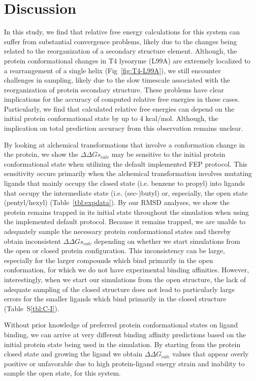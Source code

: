 \documentclass[journal=jctcce,manuscript=article]{achemso}
\begin{document}
\section{Discussion}
In this study, we find that relative free energy calculations for this system can suffer from substantial convergence problems, likely due to the changes being related to the reorganization of a secondary structure element.
Although, the protein conformational changes in T4 lysozyme (L99A) are extremely localized to a rearrangement of a single helix (Fig~\ref{fig:T4-L99A}), we still encounter challenges in sampling, likely due to the slow timescale associated with the reorganization of protein secondary structure.
These problems have clear implications for the accuracy of computed relative free energies in these cases. 
Particularly, we find that calculated relative free energies can depend on the initial protein conformational state by up to 4 kcal/mol.
Although, the implication on total prediction accuracy from this observation remains unclear.

By looking at alchemical transformations that involve a conformation change in the protein, we show the $\Delta\Delta Gs_{calc}$ may be sensitive to the initial protein conformational state when utilizing the default implemented FEP protocol.
This sensitivity occurs primarily when the alchemical transformation involves mutating ligands that mainly occupy the closed state (i.e. benzene to propyl) into ligands that occupy the intermediate state (i.e. (sec-)butyl) or, especially, the open state (pentyl/hexyl) (Table~\ref{tbl:expdata}).
By our RMSD analyses, we show the protein remains trapped in its initial state throughout the simulation when using the implemented default protocol.
Because it remains trapped, we are unable to adequately sample the necessary protein conformational states and thereby obtain inconsistent $\Delta\Delta Gs_{calc}$ depending on whether we start simulations from the open or closed protein configuration.  
This inconsistency can be large, especially for the larger compounds which bind primarily in the open conformation, for which we do not have experimental binding affinities. 
However, interestingly, when we start our simulations from the open structure, the lack of adequate sampling of the closed structure does not lead to particularly large errors for the smaller ligands which bind primarily in the closed structure (Table~S\ref{tbl:C-I}). 

Without prior knowledge of preferred protein conformational states on ligand binding, we can arrive at very different binding affinity predictions based on the initial protein state being used in the simulation.
By starting from the protein closed state and growing the ligand we obtain $\Delta\Delta G_{calc}$ values that appear overly positive or unfavorable due to high protein-ligand energy strain and inability to sample the open state, for this system.
\end{document}
